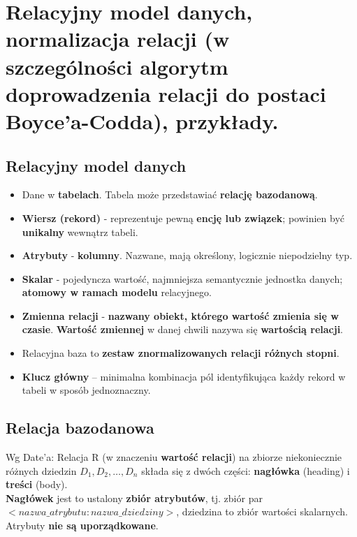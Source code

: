 \documentclass[main.tex]{subfiles}
\begin{document}
    \setcounter{section}{75}

    \section{Relacyjny model danych, normalizacja relacji (w szczególności algorytm doprowadzenia relacji do postaci
    Boyce’a-Codda), przykłady.}

    \subsection{Relacyjny model danych}
    \begin{itemize}[noitemsep]
        \item Dane w \textbf{tabelach}. Tabela może przedstawiać \textbf{relację bazodanową}.
        \item \textbf{Wiersz (rekord)} - reprezentuje pewną \textbf{encję lub związek}; powinien być
        \textbf{unikalny} wewnątrz tabeli.
        \item \textbf{Atrybuty} - \textbf{kolumny}. Nazwane, mają określony, logicznie niepodzielny typ.
        \item \textbf{Skalar} - pojedyncza wartość, najmniejsza semantycznie jednostka danych; \textbf{atomowy w ramach modelu} relacyjnego.
        \item \textbf{Zmienna relacji} - \textbf{nazwany obiekt, którego wartość zmienia się w czasie}.
        \textbf{Wartość zmiennej} w danej chwili nazywa się \textbf{wartością relacji}.
        \item Relacyjna baza to \textbf{zestaw znormalizowanych relacji różnych stopni}.
        \item  \textbf{Klucz główny} -- minimalna kombinacja pól identyfikująca każdy rekord w tabeli w sposób jednoznaczny.
    \end{itemize}

    \subsection{Relacja bazodanowa}
    Wg Date'a: Relacja R (w znaczeniu \textbf{wartość relacji}) na zbiorze niekoniecznie różnych dziedzin $D_1, D_2,\dots, D_n$
    składa się z dwóch części: \textbf{nagłówka} (heading) i \textbf{treści} (body).\\

    \textbf{Nagłówek} jest to ustalony \textbf{zbiór atrybutów}, tj. zbiór par $<nazwa\_atrybutu :
    nazwa\_dziedziny>$, dziedzina to zbiór wartości skalarnych. Atrybuty \textbf{nie są uporządkowane}.\\
\end{document}
